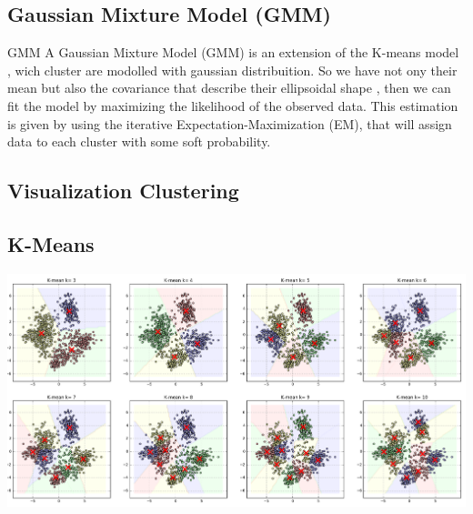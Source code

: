 \documentclass[11pt]{article}
\theoremstyle{plain}
\begin{document}
\subsection{Gaussian Mixture Model  (GMM)}
GMM A Gaussian Mixture Model (GMM) is an extension of the K-means model , wich cluster are modolled with gaussian distribuition.  So we have not ony their mean but also the covariance that describe their ellipsoidal shape , then we can fit the model by maximizing the likelihood of the observed data. This estimation is given by using the iterative Expectation-Maximization (EM), that will assign data to each cluster with some soft probability. 

 
 
 
 
 \subsection{Visualization Clustering}
 \subsection*{K-Means}
 
 
\begin{center}
\includegraphics[scale=0.28]{1}
\end{center}
\end{document}
